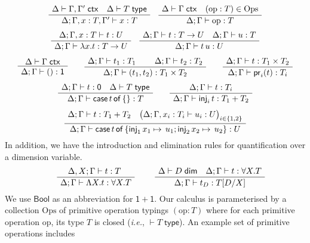 \documentclass[a4paper,UKenglish]{lipics}
\theoremstyle{plain}
\newcommand{\msf}[1]{\mathsf{#1}} %
\newcommand{\unitTy}{\msf{1}}
\newcommand{\emptyTy}{\msf{0}}
\newcommand{\bool}{\msf{Bool}}
\newcommand{\cj}[2]{#1 \vdash #2 \; \msf{ ctx}}
\newcommand{\Tj}[2]{#1 \vdash #2 \; \msf{ type}}
\newcommand{\Dj}[2]{#1 \vdash #2 \; \msf{ dim}}
\newcommand{\tj}[4]{#1;#2 \vdash #3 : #4}
\newcommand{\proj}{\mathsf{pr}}
\newcommand{\inj}{\mathsf{inj}}
\newcommand{\emptyelim}[1]{\mathsf{case}\,#1\,\mathsf{of}\,\{\}}
\newcommand{\case}[5]{\mathsf{case}\,#1\,\mathsf{of}\,\{\inj_1\,#2 \mapsto\,#3; \inj_2\,#4\mapsto\,#5\}}
\newcommand{\Dim}{D}
\newcommand{\Dvar}{X}
\begin{document}
\[\begin{array}{c}%
\AxiomC{%
$\cj \Delta{\Gamma,\Gamma'}\quad
\Tj\Delta T$}
\UnaryInfC
{$\tj \Delta{\Gamma,x:T,\Gamma'}xT$}
\DisplayProof
\quad
\AxiomC{%
$\cj \Delta\Gamma\quad(\mathrm{op}:T) \in \mathrm{Ops}$}
\UnaryInfC
{$\tj \Delta\Gamma{\mathrm{op}}T$}
\DisplayProof
\\[5mm]
\AxiomC{%
$
\tj\Delta {\Gamma,x:T} {t}{U}
$%
}
\UnaryInfC
{$\tj\Delta {\Gamma} {\lambda x.t}{T\to U}$}
\DisplayProof
\quad
\AxiomC{%
$
\tj\Delta {\Gamma} {t}{T\to U}\quad
\tj\Delta {\Gamma} {u}{T}
$%
}
\UnaryInfC
{$\tj \Delta{\Gamma}{t\,u}U$}
\DisplayProof
\\[5mm]
\AxiomC{%
$\cj\Delta {\Gamma}
$%
}
\UnaryInfC
{$\tj \Delta{\Gamma}{()}\unitTy$}
\DisplayProof
\qquad
\AxiomC{$\tj\Delta {\Gamma} {t_1}{T_1}$}
\AxiomC{$\tj\Delta {\Gamma} {t_2}{T_2}$}
\BinaryInfC
{$\tj \Delta{\Gamma}{(t_1,t_2)}{T_1\times T_2}$}
\DisplayProof
\qquad
\AxiomC{%
$
\tj\Delta {\Gamma} {t}{T_1\times T_2}
$%
}
\UnaryInfC
{$\tj\Delta {\Gamma} {\proj_i(t)}{T_i}$}
\DisplayProof
\\[5mm]
\AxiomC{%
$
\tj\Delta {\Gamma} {t}{\emptyTy}
\quad \Tj\Delta T$%
}
\UnaryInfC
{$\tj\Delta {\Gamma} {\emptyelim t}{T}$}
\DisplayProof
\qquad
\AxiomC{%
$
\tj\Delta {\Gamma} {t}{T_i}$}
\UnaryInfC
{$\tj\Delta {\Gamma} {\inj_i\,t}{T_1 + T_2}$}
\DisplayProof
\\[5mm]
\AxiomC{$\tj\Delta {\Gamma} {t}{T_1 + T_2}
\quad \big(\tj\Delta {\Gamma, x_i : T_i} {u_i}{U}\big)_{i\in\{1,2\}}$}
\UnaryInfC
{$\tj\Delta {\Gamma} {\case{t}{x_1}{u_1}{x_2}{u_2}}{U}$}
\DisplayProof
\end{array}\]
%
In addition, we have the introduction and elimination rules for quantification over a dimension variable.
\[\begin{array}{cc}
\hspace{5mm}
\AxiomC{$\tj{\Delta,\Dvar}\Gamma tT$ }
		\UnaryInfC{$\tj \Delta  \Gamma {\Lambda \Dvar.t} {\forall X.T}$}
		\DisplayProof

&\hspace{5mm}
\AxiomC{$\Dj\Delta \Dim \quad \tj \Delta \Gamma  t{\forall \Dvar.T}$}
	\UnaryInfC{$\tj \Delta  \Gamma {t_\Dim}{T[\Dim/\Dvar]}$}
	\DisplayProof
\end{array}\]
%
We use $\bool$ as an abbreviation for $\unitTy + \unitTy$.  Our
calculus is parameterised by a collection $\mathrm{Ops}$ of primitive
operation typings $(\mathrm{op} : T)$ where for each primitive
operation $\mathrm{op}$, its type $T$ is closed (\emph{i.e.},
$\Tj{}T$). An example set of primitive operations includes
\end{document}
